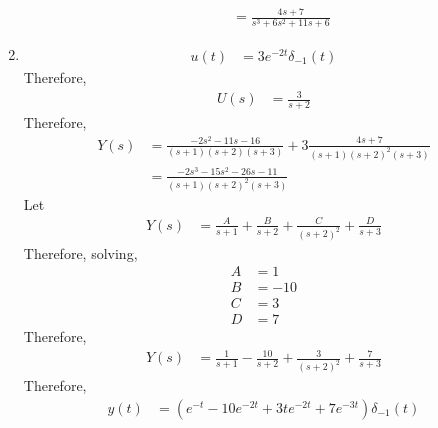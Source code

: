 \documentclass[fleqn, a4paper, 11pt, oneside]{amsart}
\theoremstyle{definition}
\theoremstyle{theorem}
\begin{document}
\begin{solution}
\begin{enumerate}[leftmargin=*]
\begin{enumerate}[leftmargin=*]
\begin{align*}
                             & = \frac{4 s + 7}{s^3 + 6 s^2 + 11 s + 6}
					\end{align*}
			\end{enumerate}
		\item
			\begin{align*}
				u(t) & = 3 e^{-2 t} \delta_{-1}(t)
			\end{align*}
			Therefore,
			\begin{align*}
				U(s) & = \frac{3}{s + 2}
			\end{align*}
			Therefore,
			\begin{align*}
				Y(s) & = \frac{-2 s^2 - 11 s - 16}{(s + 1) (s + 2) (s + 3)} + 3 \frac{4 s + 7}{(s + 1) (s + 2)^2 (s + 3)} \\
                     & = \frac{-2 s^3 - 15 s^2 - 26 s - 11}{(s + 1) (s + 2)^2 (s + 3)}
			\end{align*}
			Let
			\begin{align*}
				Y(s) & = \frac{A}{s + 1} + \frac{B}{s + 2} + \frac{C}{(s + 2)^2} + \frac{D}{s + 3}
			\end{align*}
			Therefore, solving,
			\begin{align*}
				A & = 1   \\
				B & = -10 \\
				C & = 3   \\
				D & = 7
			\end{align*}
			Therefore,
			\begin{align*}
				Y(s) & = \frac{1}{s + 1} - \frac{10}{s + 2} + \frac{3}{(s + 2)^2} + \frac{7}{s + 3}
			\end{align*}
			Therefore,
			\begin{align*}
				y(t) & = \left( e^{-t} - 10 e^{-2 t} + 3 t e^{-2 t} + 7 e^{-3 t} \right) \delta_{-1}(t)
			\end{align*}
	\end{enumerate}
\end{solution}
\end{document}
